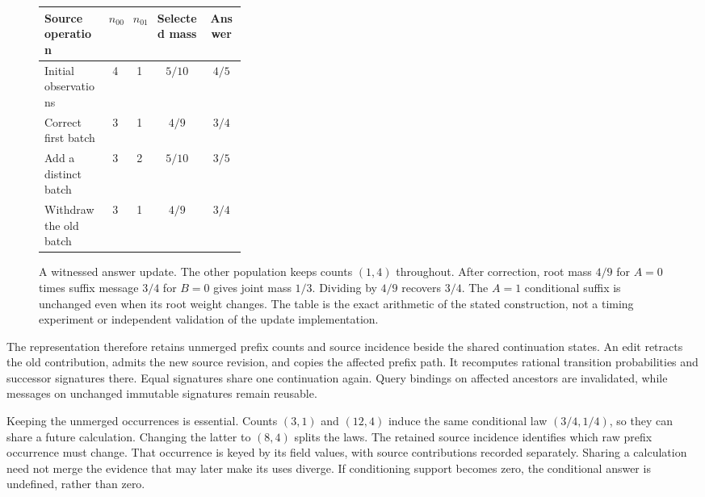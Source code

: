 \begin{figure}[htbp]
\centering
\small
\begin{tabular}{p{0.32\linewidth}cccc}
\hline
Source operation & $n_{00}$ & $n_{01}$ & Selected mass & Answer\\
\hline
Initial observations & 4 & 1 & $5/10$ & $4/5$\\
Correct first batch & 3 & 1 & $4/9$ & $3/4$\\
Add a distinct batch & 3 & 2 & $5/10$ & $3/5$\\
Withdraw the old batch & 3 & 1 & $4/9$ & $3/4$\\
\hline
\end{tabular}

\vspace{0.8em}
\caption{A witnessed answer update. The other population keeps counts $(1,4)$ throughout. After correction, root mass $4/9$ for $A=0$ times suffix message $3/4$ for $B=0$ gives joint mass $1/3$. Dividing by $4/9$ recovers $3/4$. The $A=1$ conditional suffix is unchanged even when its root weight changes. The table is the exact arithmetic of the stated construction, not a timing experiment or independent validation of the update implementation.}
\label{fig:dynamic-witnessed-update}
\end{figure}

The representation therefore retains unmerged prefix counts and source incidence beside the shared continuation states. An edit retracts the old contribution, admits the new source revision, and copies the affected prefix path. It recomputes rational transition probabilities and successor signatures there. Equal signatures share one continuation again. Query bindings on affected ancestors are invalidated, while messages on unchanged immutable signatures remain reusable.

Keeping the unmerged occurrences is essential. Counts $(3,1)$ and $(12,4)$ induce the same conditional law $(3/4,1/4)$, so they can share a future calculation. Changing the latter to $(8,4)$ splits the laws. The retained source incidence identifies which raw prefix occurrence must change. That occurrence is keyed by its field values, with source contributions recorded separately. Sharing a calculation need not merge the evidence that may later make its uses diverge. If conditioning support becomes zero, the conditional answer is undefined, rather than zero.


